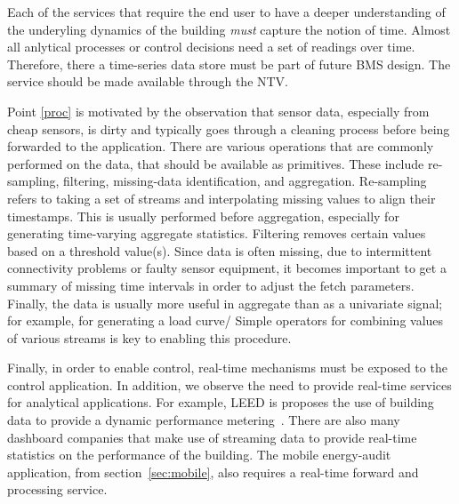 Each of the services that require the end user to have a deeper understanding of the underyling dynamics 
of the building \emph{must} capture the notion of time.  Almost all anlytical processes or control decisions need a set of readings
over time.  Therefore, there a time-series data store must be part of future BMS design.  The service should be made available
through the NTV.  %

Point \ref{proc} is motivated by the observation that sensor data, especially from cheap sensors, is dirty and typically goes
through a cleaning process before being forwarded to the application.  There are various operations that are commonly
performed on the data, that should be available as primitives.  These include re-sampling, filtering,  
missing-data identification, and aggregation.  Re-sampling refers to taking a set of streams and interpolating missing values to 
align their timestamps.  This is usually performed before aggregation, especially for generating time-varying aggregate statistics.
Filtering removes certain values based on a threshold value(s).  
Since data is often missing, due to intermittent connectivity problems or faulty sensor equipment, it becomes important to 
get a summary of missing time intervals in order to adjust the fetch parameters.  Finally, the data is usually more
useful in aggregate than as a univariate signal; for example, for generating a load curve/ %
Simple operators for combining values of various streams is key to enabling this procedure.

Finally, in order to enable control, real-time mechanisms must be exposed to the control application.
In addition, we observe the need to provide real-time services for analytical applications.
For example, LEED is proposes the use of building data to provide a dynamic performance metering~\cite{dynleed}.
There are also many dashboard companies that make use of streaming data to provide real-time statistics on the performance of the
building.  The mobile energy-audit application, from section~\ref{sec:mobile}, also requires a real-time forward and processing service.

